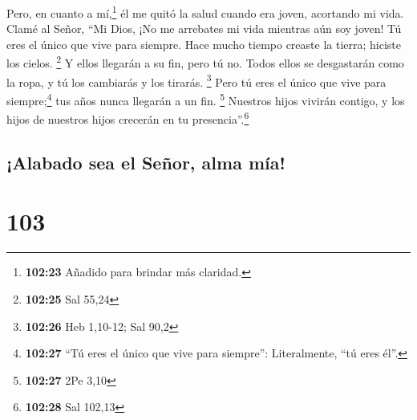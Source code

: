 Pero, en cuanto a mí,\footnote{\textbf{102:23} Añadido
  para brindar más claridad.} él me quitó la salud cuando era joven,
acortando mi vida.  Clamé al Señor, ``Mi Dios, ¡No me
arrebates mi vida mientras aún soy joven! Tú eres el único que vive para
siempre.  Hace mucho tiempo creaste la tierra; hiciste
los cielos. \footnote{\textbf{102:25} Sal 55,24}  Y ellos
llegarán a su fin, pero tú no. Todos ellos se desgastarán como la ropa,
y tú los cambiarás y los tirarás. \footnote{\textbf{102:26} Heb 1,10-12;
  Sal 90,2}  Pero tú eres el único que vive para
siempre;\footnote{\textbf{102:27} ``Tú eres el único que vive para
  siempre'': Literalmente, ``tú eres él''.} tus años nunca llegarán a un
fin. \footnote{\textbf{102:27} 2Pe 3,10}  Nuestros hijos
vivirán contigo, y los hijos de nuestros hijos crecerán en tu
presencia''.\footnote{\textbf{102:28} Sal 102,13}

\hypertarget{alabado-sea-el-seuxf1or-alma-muxeda}{%
\subsection{¡Alabado sea el Señor, alma
mía!}\label{alabado-sea-el-seuxf1or-alma-muxeda}}

\hypertarget{section-102}{%
\section{103}\label{section-102}}

